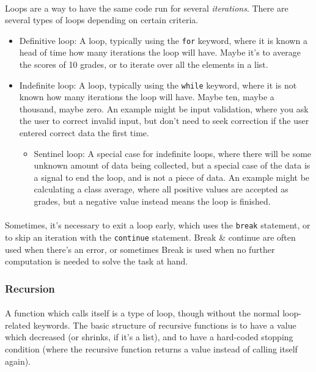 \documentclass[letter,10pt]{article}
\begin{document}
\paragraph{}Loops are a way to have the same code run for several \textit{iterations}. There are several types of loops depending on certain criteria.
\begin{itemize}
    \item Definitive loop: A loop, typically using the \verb|for| keyword, where it is known a head of time how many iterations the loop will have. Maybe it's to average the scores of 10 grades, or to iterate over all the elements in a list.
    \item Indefinite loop: A loop, typically using the \verb|while| keyword, where it is not known how many iterations the loop will have. Maybe ten, maybe a thousand, maybe zero. An example might be input validation, where you ask the user to correct invalid input, but don't need to seek correction if the user entered correct data the first time.
    \begin{itemize}
        \item Sentinel loop: A special case for indefinite loops, where there will be some unknown amount of data being collected, but a special case of the data is a signal to end the loop, and is not a piece of data. An example might be calculating a class average, where all positive values are accepted as grades, but a negative value instead means the loop is finished.
    \end{itemize}
\end{itemize}

\paragraph{}Sometimes, it's necessary to exit a loop early, which uses the \verb|break| statement, or to skip an iteration with the \verb|continue| statement. Break \& continue are often used when there's an error, or sometimes Break is used when no further computation is needed to solve the task at hand.

\subsubsection{Recursion}
\paragraph{}A function which calls itself is a type of loop, though without the normal loop-related keywords. The basic structure of recursive functions is to have a value which decreased (or shrinks, if it's a list), and to have a hard-coded stopping condition (where the recursive function returns a value instead of calling itself again).
\end{document}

